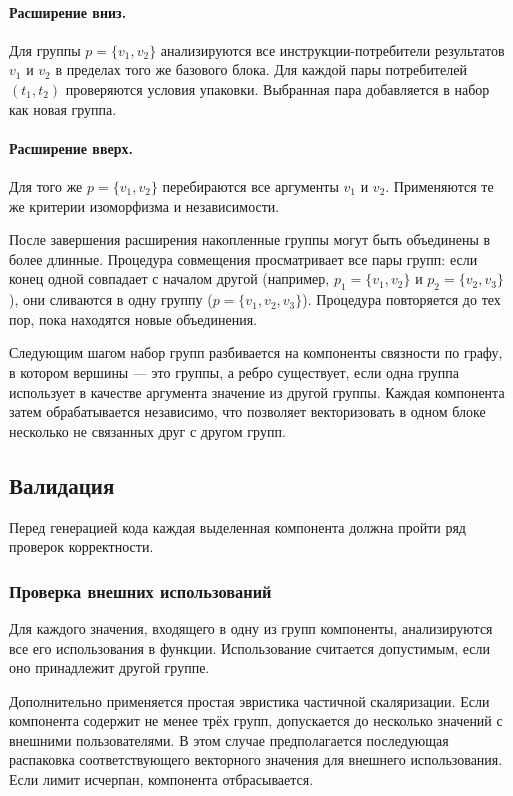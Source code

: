 \paragraph{Расширение вниз.}
Для группы \(p = \{v_1, v_2\}\) анализируются все инструкции-потребители результатов \(v_1\) и \(v_2\) в пределах того же базового блока. 
Для каждой пары потребителей \((t_1, t_2)\) проверяются условия упаковки. Выбранная пара добавляется в набор как новая группа.

\paragraph{Расширение вверх.}
Для того же \(p = \{v_1, v_2\}\) перебираются все аргументы \(v_1\) и \(v_2\). Применяются те же критерии изоморфизма и независимости.

После завершения расширения накопленные группы могут быть объединены в более длинные. Процедура совмещения просматривает все пары групп: если конец одной совпадает 
с началом другой (например, $p_1 = \{v_1, v_2\}$ и $p_2 = \{v_2, v_3\}$), они сливаются в одну группу (\(p = \{v_1, v_2, v_3\}\)). 
Процедура повторяется до тех пор, пока находятся новые объединения.

Следующим шагом набор групп разбивается на компоненты связности по графу, в котором вершины --- это группы, а ребро существует, 
если одна группа использует в качестве аргумента значение из другой группы. Каждая компонента затем обрабатывается независимо, 
что позволяет векторизовать в одном блоке несколько не связанных друг с другом групп.

\subsection{Валидация}
\label{sec:validation}

Перед генерацией кода каждая выделенная компонента должна пройти ряд проверок корректности.

\subsubsection{Проверка внешних использований}
Для каждого значения, входящего в одну из групп компоненты, анализируются все его использования в функции.
Использование считается допустимым, если оно принадлежит другой группе.

Дополнительно применяется простая эвристика частичной скаляризации. 
Если компонента содержит не менее трёх групп, допускается до несколько значений с внешними пользователями. 
В этом случае предполагается последующая распаковка соответствующего векторного значения для внешнего использования. 
Если лимит исчерпан, компонента отбрасывается.

